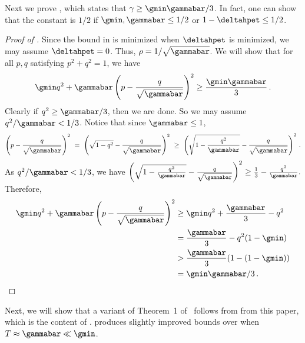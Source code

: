 \documentclass{toc}
\begin{document}
Next we prove , which states that $\gamma\geq \gmin\gammabar/3$.
In fact, one can show that the constant is $1/2$ if $\gmin,\gammabar\leq 1/2$ or
$1-\deltahpet\leq 1/2$.

%
%
%
\begin{proof}[Proof of ]
Since the bound in  is minimized when 
$\deltahpet$ is minimized, we may assume $\deltahpet=0$.
Thus, $\rho=1/\sqrt{\gammabar}$.  We will show that for all $p,q$
satisfying $p^2+q^2=1$, we have
\[\gmin q^2+\gammabar\left(p - \frac{q}{\sqrt{\gammabar}}\right)^2\geq
\frac{ \gmin\gammabar}{3}\,.\]
Clearly if $q^2\geq \gammabar/3$, then we are done.  So we may assume
$q^2/\gammabar<1/3$.  Notice that since $\gammabar\leq 1$,
\[\left(p - \frac{q}{\sqrt{\gammabar}}\right)^2
~=~ \left(\sqrt{1-q^2} - \frac{q}{\sqrt{\gammabar}}\right)^2
~\geq~ \left(\sqrt{1-\frac{q^2}{\gammabar}} -
\frac{q}{\sqrt{\gammabar}}\right)^2\,.\]
As $q^2/\gammabar<1/3$, we have
$\left(\sqrt{1-\frac{q^2}{\gammabar}} -
\frac{q}{\sqrt{\gammabar}}\right)^2\geq \frac{1}{3} -
\frac{q^2}{\gammabar}.$  Therefore,
\begin{align*}
  \gmin q^2+\gammabar\left(p -  \frac{q}{\sqrt{\gammabar}}\right)^2
  &\geq  \gmin q^2+\frac{\gammabar}{3} -q^2\\
  &= \frac{\gammabar}{3} - q^2(1-\gmin)\\
  &> \frac{\gammabar}{3}(1-(1-\gmin)) \\
  &= \gmin\gammabar/3\,.\qedhere
\end{align*}
\end{proof}
%

Next, we will show that a variant of Theorem~1 of~\cite{jstv04} follows from
 from this paper, which is the content of
.   produces
slightly improved bounds over  when
$T\approx \gammabar\ll \gmin$.  
\end{document}
